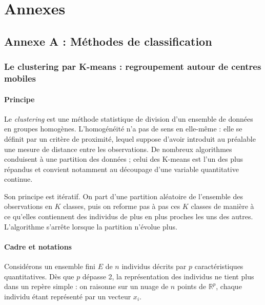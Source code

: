 \chapter*{Annexes}
{}

\section*{Annexe A : Méthodes de classification}
\label{sec:methodes-classification}

\subsection*{Le clustering par K-means : regroupement autour de centres mobiles}

\subsubsection*{Principe}

Le \textit{clustering} est une méthode statistique de division d'un ensemble de données en groupes homogènes. L'homogénéité n'a pas de sens en elle-même : elle se définit par un critère de proximité, lequel suppose d'avoir introduit au préalable une mesure de distance entre les observations. De nombreux algorithmes conduisent à une partition des données ; celui des K-means est l'un des plus répandus et convient notamment au découpage d'une variable quantitative continue.

Son principe est itératif. On part d'une partition aléatoire de l'ensemble des observations en $K$ classes, puis on reforme pas à pas ces $K$ classes de manière à ce qu'elles contiennent des individus de plus en plus proches les uns des autres. L'algorithme s'arrête lorsque la partition n'évolue plus.

\subsubsection*{Cadre et notations}

Considérons un ensemble fini $E$ de $n$ individus décrits par $p$ caractéristiques quantitatives. Dès que $p$ dépasse 2, la représentation des individus ne tient plus dans un repère simple : on raisonne sur un nuage de $n$ points de $\mathbb{R}^p$, chaque individu étant représenté par un vecteur $x_i$.

